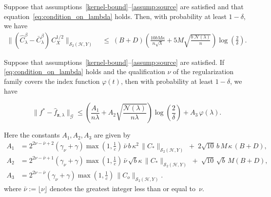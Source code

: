 \documentclass[10pt,a4paper]{amsart}
\begin{document}
\begin{lemma}\label{L2:bound-B}
Suppose that assumptions~\ref{kernel-bound}--\ref{assump:source} are satisfied and that equation~\eqref{eq:condition_on_lambda} holds. Then, with probability at least \(1-\delta\), we have
\begin{align*}
\bigl\| ( \widehat{C}_\lambda^\beta-\bar{C}_{\lambda}^\beta)\, C_X^{1/2} \bigr\|_{\mathcal S_2(\mathcal H,Y)}
\;&\leq\;
(B+D)\left(
\frac{10bM\kappa}{n\sqrt{\lambda}}
+ 5
M\sqrt{
\frac{b \; \mathcal{N}(\lambda)}{n}
}
\right)\log\!\left( \frac{2}{\delta} \right).
\end{align*}
\end{lemma}

\begin{theorem}\label{vrkhs:theorem:proof}
Suppose that {assumptions~\ref{kernel-bound}--\ref{assump:source}} are satisfied.
If \eqref{eq:condition_on_lambda} holds and the qualification $\nu$ of the regularization family covers the index function \(\varphi(t)\),
then with probability at least \(1-\delta\), we have

\[
\big\|f^*-\widehat{f}_{\textbf{z},\lambda}\big\|_{\mathcal G}\leq \left(
\frac{A_1}{n\lambda}
+ A_2\sqrt{\frac{\mathcal{N}(\lambda)}{n\lambda}}
\right) \log\left(\frac{2}{\delta}\right)
+ A_3\,\varphi(\lambda).
\]

\noindent
Here the constants $A_1,A_2,A_3$ are given by 
\begin{align*}
A_1
&= 2^{2\nu- \bar \nu+2}(\gamma_\nu+\gamma)\max\!\left(1,\frac{1}{c}\right)
\,\bar \nu\, b\,\kappa^{2}\,\|C_{*}\|_{\mathcal S_2(\mathcal H,Y)}
\;+\; 2\sqrt{10}\,b\,M\,\kappa\,(B+D), \\[6pt]
A_2
&= 2^{2\nu- \bar \nu+1}(\gamma_\nu+\gamma)\max\!\left(1,\frac{1}{c}\right)
\, \bar \nu\, \sqrt{b}\kappa\,\|C_{*}\|_{\mathcal S_2(\mathcal H,Y)}
\;+\; \sqrt{10}\,\sqrt{b}\,M(B+D), \\[6pt]
A_3
&= 2^{2\nu- \bar \nu}(\gamma_\nu+\gamma)\max\!\left(1,\frac{1}{c}\right)
\,\|C_{o}\|_{\mathcal S_2(\mathcal H,Y)}.
\end{align*}
where $\bar{\nu} := \lfloor \nu  \rfloor$ denotes the greatest integer
less than or equal to~$\nu $.
\end{theorem}
\end{document}
